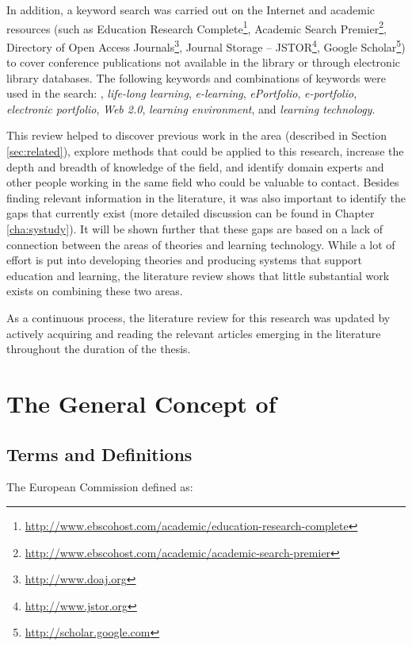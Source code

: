 In addition, a keyword search was carried out on the Internet and academic
resources (such as Education Research
Complete\footnote{\url{http://www.ebscohost.com/academic/education-research-complete}},
Academic Search
Premier\footnote{\url{http://www.ebscohost.com/academic/academic-search-premier}},
Directory of Open Access Journals\footnote{\url{http://www.doaj.org}}, Journal
Storage -- JSTOR\footnote{\url{http://www.jstor.org}}, Google
Scholar\footnote{\url{http://scholar.google.com}}) to cover conference publications not available in the library or through electronic library
databases. The following keywords and combinations of keywords were used in the
search: \textit{\LLLsn}, \textit{life-long learning}, \textit{e-learning},
\textit{ePortfolio}, \textit{e-portfolio}, \textit{electronic portfolio},
\textit{Web 2.0}, \textit{learning environment}, and \textit{learning technology}.

This review helped to discover previous work in the area (described in Section
\ref{sec:related}), explore methods that could be applied to this research,
increase the depth and breadth of knowledge of the field, and identify domain
experts and other people working in the same field who could be valuable to
contact. Besides finding relevant information in the literature, it was also
important to identify the gaps that currently exist (more detailed discussion
can be found in Chapter \ref{cha:systudy}). It will be shown further that these
gaps are based on a lack of connection between the areas of \LLLs theories and
learning technology. While a lot of effort is put into developing theories and
producing systems that support education and learning, the literature review
shows that little substantial work exists on combining these two areas.

As a continuous process, the literature review for this research was updated by
actively acquiring and reading the relevant articles emerging in the literature
throughout the duration of the thesis.

\section{The General Concept of \LLLc}
\label{sec:concepts}
\subsection{Terms and Definitions}

The European Commission \citeyearpar{EuropeanCommission2000} defined \LLLs as:

